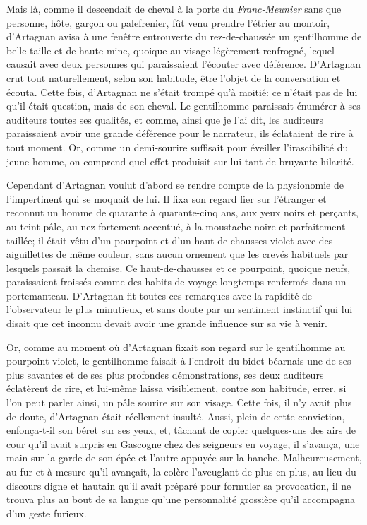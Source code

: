 Mais là, comme il descendait de cheval à la porte du \textit{Franc-Meunier} sans que personne, hôte, garçon ou palefrenier, fût venu prendre l'étrier au montoir, d'Artagnan avisa à une fenêtre entrouverte du rez-de-chaussée un gentilhomme de belle taille et de haute mine, quoique au visage légèrement renfrogné, lequel causait avec deux personnes qui paraissaient l'écouter avec déférence. D'Artagnan crut tout naturellement, selon son habitude, être l'objet de la conversation et écouta. Cette fois, d'Artagnan ne s'était trompé qu'à moitié: ce n'était pas de lui qu'il était question, mais de son cheval. Le gentilhomme paraissait énumérer à ses auditeurs toutes ses qualités, et comme, ainsi que je l'ai dit, les auditeurs paraissaient avoir une grande déférence pour le narrateur, ils éclataient de rire à tout moment. Or, comme un demi-sourire suffisait pour éveiller l'irascibilité du jeune homme, on comprend quel effet produisit sur lui tant de bruyante hilarité. 

Cependant d'Artagnan voulut d'abord se rendre compte de la physionomie de l'impertinent qui se moquait de lui. Il fixa son regard fier sur l'étranger et reconnut un homme de quarante à quarante-cinq ans, aux yeux noirs et perçants, au teint pâle, au nez fortement accentué, à la moustache noire et parfaitement taillée; il était vêtu d'un pourpoint et d'un haut-de-chausses violet avec des aiguillettes de même couleur, sans aucun ornement que les crevés habituels par lesquels passait la chemise. Ce haut-de-chausses et ce pourpoint, quoique neufs, paraissaient froissés comme des habits de voyage longtemps renfermés dans un portemanteau. D'Artagnan fit toutes ces remarques avec la rapidité de l'observateur le plus minutieux, et sans doute par un sentiment instinctif qui lui disait que cet inconnu devait avoir une grande influence sur sa vie à venir. 

Or, comme au moment où d'Artagnan fixait son regard sur le gentilhomme au pourpoint violet, le gentilhomme faisait à l'endroit du bidet béarnais une de ses plus savantes et de ses plus profondes démonstrations, ses deux auditeurs éclatèrent de rire, et lui-même laissa visiblement, contre son habitude, errer, si l'on peut parler ainsi, un pâle sourire sur son visage. Cette fois, il n'y avait plus de doute, d'Artagnan était réellement insulté. Aussi, plein de cette conviction, enfonça-t-il son béret sur ses yeux, et, tâchant de copier quelques-uns des airs de cour qu'il avait surpris en Gascogne chez des seigneurs en voyage, il s'avança, une main sur la garde de son épée et l'autre appuyée sur la hanche. Malheureusement, au fur et à mesure qu'il avançait, la colère l'aveuglant de plus en plus, au lieu du discours digne et hautain qu'il avait préparé pour formuler sa provocation, il ne trouva plus au bout de sa langue qu'une personnalité grossière qu'il accompagna d'un geste furieux. 

